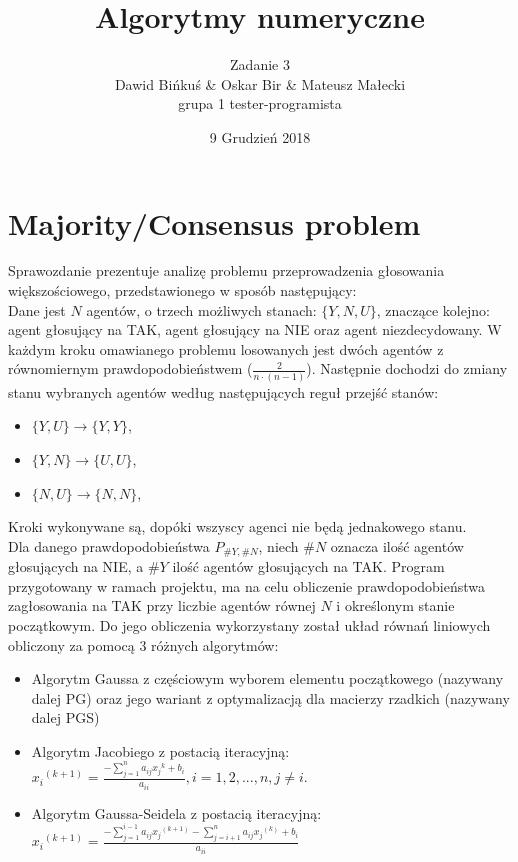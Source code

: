 \documentclass[10pt]{article}
\title{Algorytmy numeryczne}
\author{Zadanie 3 \\ Dawid Bińkuś \& Oskar Bir \& Mateusz Małecki\\grupa 1 tester-programista}
\date{9 Grudzień 2018}
\begin{document}
\maketitle 

\section{Majority/Consensus problem}
Sprawozdanie prezentuje analizę problemu przeprowadzenia głosowania większościowego, przedstawionego w sposób następujący:\\
Dane jest $N$ agentów, o trzech możliwych stanach: $\{Y,N,U\}$, znaczące kolejno: agent głosujący na TAK, agent głosujący na NIE oraz agent niezdecydowany.
W każdym kroku omawianego problemu losowanych jest dwóch agentów z równomiernym prawdopodobieństwem ($\frac{2}{n\cdot (n-1)}$). Następnie dochodzi do zmiany stanu wybranych agentów według następujących reguł przejść stanów:
\begin{itemize}
	\item $\{Y,U\} \to \{Y,Y\}$,
	\item $\{Y,N\} \to \{U,U\}$,
	\item $\{N,U\} \to \{N,N\}$,
\end{itemize}
Kroki wykonywane są, dopóki wszyscy agenci nie będą jednakowego stanu.
\\
Dla danego prawdopodobieństwa $P_{\#Y,\#N}$, niech $\#N$ oznacza ilość agentów głosujących na NIE, a $\#Y$ ilość agentów głosujących na TAK.
Program przygotowany w ramach projektu, ma na celu obliczenie prawdopodobieństwa zagłosowania na TAK przy liczbie agentów równej $N$ i określonym stanie początkowym. Do jego obliczenia wykorzystany został układ równań liniowych obliczony za pomocą 3 różnych algorytmów:
\begin{itemize}
	\item Algorytm Gaussa z częściowym wyborem elementu początkowego (nazywany dalej PG) oraz jego wariant z optymalizacją dla macierzy rzadkich (nazywany dalej PGS)
	\item Algorytm Jacobiego z postacią iteracyjną:\\
	${x_{i}}^{(k+1)}=\frac{-\sum_{j=1}^{n}a_{ij}{x_j}^{k}+b_i}{a_{ii}}, i=1,2,...,n,  j\neq i.$
	\item Algorytm Gaussa-Seidela z postacią iteracyjną:\\
	${x_{i}}^{(k+1)}=\frac{-\sum_{j=1}^{i-1}a_{ij}{x_j}^{(k+1)}-\sum_{j=i+1}^{n}a_{ij}{x_j}^{(k)}+b_i}{a_{ii}}$
\end{itemize}
\end{document}
